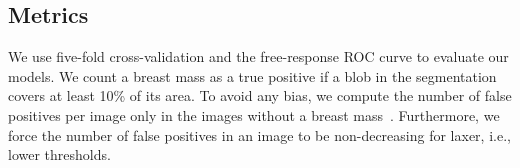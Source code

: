 \subsection{Metrics}
We use five-fold cross-validation and the free-response ROC curve to evaluate our models. We count a breast mass as a true positive if a blob in the segmentation covers at least 10\% of its area. To avoid any bias, we compute the number of false positives per image only in the images without a breast mass~\cite{Chakraborty2013}. Furthermore, we force the number of false positives in an image to be non-decreasing for laxer, i.e., lower thresholds.
